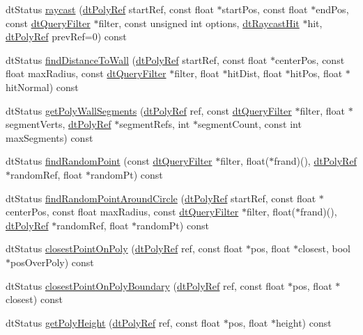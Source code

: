 \begin{Indent}
\begin{DoxyCompactItemize}
\item 
dt\+Status \hyperlink{classdtNavMeshQuery_a96bd4282df1e863d1c813b2fe881a262}{raycast} (\hyperlink{group__detour_gab4e0b2257a670c1a800057999612b466}{dt\+Poly\+Ref} start\+Ref, const float $\ast$start\+Pos, const float $\ast$end\+Pos, const \hyperlink{classdtQueryFilter}{dt\+Query\+Filter} $\ast$filter, const unsigned int options, \hyperlink{structdtRaycastHit}{dt\+Raycast\+Hit} $\ast$hit, \hyperlink{group__detour_gab4e0b2257a670c1a800057999612b466}{dt\+Poly\+Ref} prev\+Ref=0) const
\item 
dt\+Status \hyperlink{classdtNavMeshQuery_a1576a980ae29e44ad4809a25974fbd40}{find\+Distance\+To\+Wall} (\hyperlink{group__detour_gab4e0b2257a670c1a800057999612b466}{dt\+Poly\+Ref} start\+Ref, const float $\ast$center\+Pos, const float max\+Radius, const \hyperlink{classdtQueryFilter}{dt\+Query\+Filter} $\ast$filter, float $\ast$hit\+Dist, float $\ast$hit\+Pos, float $\ast$hit\+Normal) const
\item 
dt\+Status \hyperlink{classdtNavMeshQuery_a2c49662f07e52f1488622089952a154c}{get\+Poly\+Wall\+Segments} (\hyperlink{group__detour_gab4e0b2257a670c1a800057999612b466}{dt\+Poly\+Ref} ref, const \hyperlink{classdtQueryFilter}{dt\+Query\+Filter} $\ast$filter, float $\ast$segment\+Verts, \hyperlink{group__detour_gab4e0b2257a670c1a800057999612b466}{dt\+Poly\+Ref} $\ast$segment\+Refs, int $\ast$segment\+Count, const int max\+Segments) const
\item 
dt\+Status \hyperlink{classdtNavMeshQuery_af86c392a14bd788b0caecf21d9fb4b3d}{find\+Random\+Point} (const \hyperlink{classdtQueryFilter}{dt\+Query\+Filter} $\ast$filter, float($\ast$frand)(), \hyperlink{group__detour_gab4e0b2257a670c1a800057999612b466}{dt\+Poly\+Ref} $\ast$random\+Ref, float $\ast$random\+Pt) const
\item 
dt\+Status \hyperlink{classdtNavMeshQuery_abfb87531eb962cbd51c649469de2e4fa}{find\+Random\+Point\+Around\+Circle} (\hyperlink{group__detour_gab4e0b2257a670c1a800057999612b466}{dt\+Poly\+Ref} start\+Ref, const float $\ast$center\+Pos, const float max\+Radius, const \hyperlink{classdtQueryFilter}{dt\+Query\+Filter} $\ast$filter, float($\ast$frand)(), \hyperlink{group__detour_gab4e0b2257a670c1a800057999612b466}{dt\+Poly\+Ref} $\ast$random\+Ref, float $\ast$random\+Pt) const
\item 
dt\+Status \hyperlink{classdtNavMeshQuery_a07a90efe5d1a2b4b530aa236370574d9}{closest\+Point\+On\+Poly} (\hyperlink{group__detour_gab4e0b2257a670c1a800057999612b466}{dt\+Poly\+Ref} ref, const float $\ast$pos, float $\ast$closest, bool $\ast$pos\+Over\+Poly) const
\item 
dt\+Status \hyperlink{classdtNavMeshQuery_aa53b9573e61eda951213ea9e4354e744}{closest\+Point\+On\+Poly\+Boundary} (\hyperlink{group__detour_gab4e0b2257a670c1a800057999612b466}{dt\+Poly\+Ref} ref, const float $\ast$pos, float $\ast$closest) const
\item 
dt\+Status \hyperlink{classdtNavMeshQuery_af8303a12749e252c6688c15c5c887b69}{get\+Poly\+Height} (\hyperlink{group__detour_gab4e0b2257a670c1a800057999612b466}{dt\+Poly\+Ref} ref, const float $\ast$pos, float $\ast$height) const
\end{DoxyCompactItemize}
\end{Indent}
